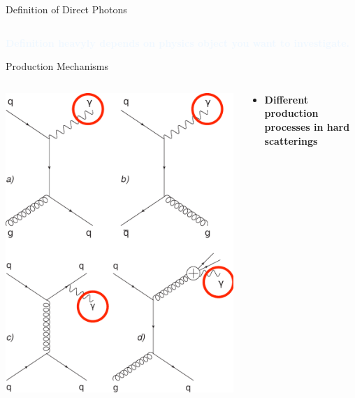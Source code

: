 \documentclass[aspectratio=169,10pt]{beamer}
\begin{document}
\begin{frame}{Definition of Direct Photons}
\begin{columns}
\begin{column}{5cm}
      \end{column}
    \end{columns}
    \vspace{0.5cm}
    \centering
    \textcolor{AliceBlue}{\textbf{\Large Definition heavyly depends on physics object you want to investigate. }}
  \end{frame}

  \begin{frame}{Production Mechanisms}
    \large
   \begin{columns}
    \begin{column}{5.5cm}
     \includegraphics[width=\textwidth]{general/feymangraphs.pdf}
    \end{column}
    \begin{column}{9cm}
      \begin{itemize}
       \itemsep0.5em
       \item \textbf{Different production processes in hard scatterings}
              \begin{itemize}

\end{itemize}
\end{itemize}
\end{column}
\end{columns}
\end{frame}
\end{document}
